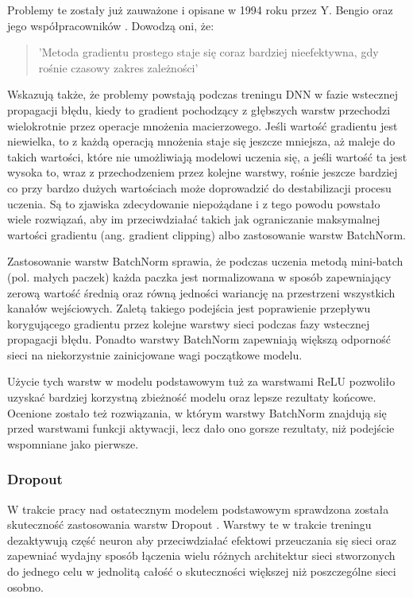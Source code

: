   Problemy te zostały już zauważone i opisane w 1994 roku przez Y. Bengio
  oraz jego współpracowników \cite{exploding_vanishing_grad}. Dowodzą oni, że:
  \begin{quote}
    'Metoda gradientu prostego staje się coraz bardziej nieefektywna, gdy
    rośnie czasowy zakres zależności'
  \end{quote}
  Wskazują także, że problemy powstają podczas treningu DNN w fazie wstecznej
  propagacji błędu, kiedy to gradient pochodzący z głębszych warstw przechodzi
  wielokrotnie przez operacje mnożenia macierzowego. Jeśli wartość gradientu
  jest niewielka, to z każdą operacją mnożenia staje się jeszcze mniejsza, aż
  maleje do takich wartości, które nie umożliwiają modelowi uczenia się, a jeśli
  wartość ta jest wysoka to, wraz z przechodzeniem przez kolejne warstwy, rośnie
  jeszcze bardziej co przy bardzo dużych wartościach może doprowadzić do
  destabilizacji procesu uczenia. Są to zjawiska zdecydowanie niepożądane i z
  tego powodu powstało wiele rozwiązań, aby im przeciwdziałać takich jak
  ograniczanie maksymalnej wartości gradientu (ang. gradient clipping) albo
  zastosowanie warstw BatchNorm.

  Zastosowanie warstw BatchNorm sprawia, że podczas uczenia metodą mini-batch
  (pol. małych paczek) każda paczka jest
  normalizowana w sposób zapewniający zerową wartość średnią oraz
  równą jedności wariancję na przestrzeni wszystkich kanałów wejściowych.
  Zaletą takiego podejścia jest poprawienie przepływu korygującego gradientu
  przez kolejne warstwy sieci podczas fazy wstecznej propagacji błędu. Ponadto
  warstwy BatchNorm zapewniają większą odporność sieci na niekorzystnie zainicjowane
  wagi początkowe modelu.

  Użycie tych warstw w modelu podstawowym tuż za warstwami ReLU pozwoliło
  uzyskać bardziej korzystną zbieżność modelu oraz lepsze rezultaty końcowe.
  Ocenione zostało też rozwiązania, w którym warstwy BatchNorm znajdują się
  przed warstwami funkcji aktywacji, lecz dało ono gorsze rezultaty, niż
  podejście wspomniane jako pierwsze.

\subsubsection{Dropout} \label{Dropout}

  W trakcie pracy nad ostatecznym modelem podstawowym sprawdzona została
  skuteczność zastosowania warstw Dropout \cite{dropout}. Warstwy te w trakcie
  treningu dezaktywują część neuron aby przeciwdziałać efektowi przeuczania
  się sieci oraz zapewniać wydajny sposób łączenia wielu różnych architektur
  sieci stworzonych do jednego celu w jednolitą całość o skuteczności większej
  niż poszczególne sieci osobno.

